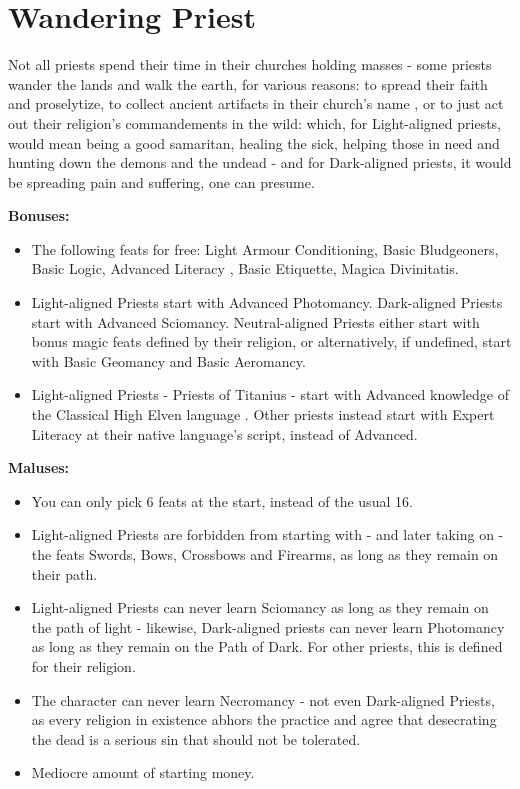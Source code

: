 \section{Wandering Priest}
Not all priests spend their time in their churches holding masses - some priests wander the lands and walk the earth, for various reasons: to spread their faith and proselytize, to collect ancient artifacts in their church's name , or to just act out their religion's commandements in the wild: which, for Light-aligned priests, would mean being a good samaritan, healing the sick, helping those in need and hunting down the demons and the undead - and for Dark-aligned priests, it would be spreading pain and suffering, one can presume. 


\textbf{Bonuses:}
\begin{itemize}
	\item The following feats for free: Light Armour Conditioning, Basic Bludgeoners, Basic Logic, Advanced Literacy , Basic Etiquette, Magica Divinitatis.
	\item Light-aligned Priests start with Advanced Photomancy. Dark-aligned Priests start with Advanced Sciomancy. Neutral-aligned Priests either start with bonus magic feats defined by their religion, or alternatively, if undefined, start with Basic Geomancy and Basic Aeromancy.
	\item Light-aligned Priests - Priests of Titanius - start with Advanced knowledge of the Classical High Elven language . Other priests instead start with Expert Literacy at their native language's script, instead of Advanced.
\end{itemize}


\textbf{Maluses:}
\begin{itemize}
	\item You can only pick 6 feats at the start, instead of the usual 16.
	\item Light-aligned Priests are forbidden from starting with - and later taking on - the feats Swords, Bows, Crossbows and Firearms, as long as they remain on their path.
	\item Light-aligned Priests can never learn Sciomancy as long as they remain on the path of light - likewise, Dark-aligned priests can never learn Photomancy as long as they remain on the Path of Dark. For other priests, this is defined for their religion.
	\item The character can never learn Necromancy - not even Dark-aligned Priests, as every religion in existence  abhors the practice and agree that desecrating the dead is a serious sin that should not be tolerated.
	\item Mediocre amount of starting money.
\end{itemize}
